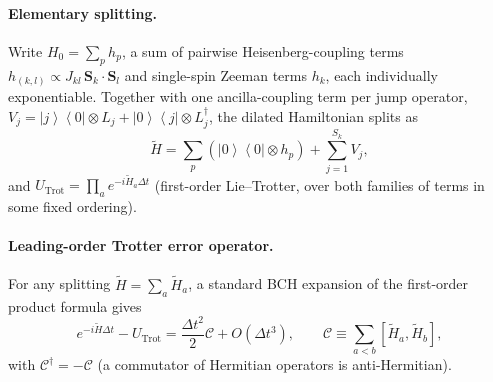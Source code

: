 \documentclass[11pt]{article}
\newcommand{\Dt}{\Delta t}
\newcommand{\calC}{\mathcal{C}}
\renewcommand{\ket}[1]{\left| #1 \right\rangle}
\renewcommand{\bra}[1]{\left\langle #1 \right|}
\begin{document}
\paragraph{Elementary splitting.} Write $H_0=\sum_ph_p$, a sum of pairwise Heisenberg-coupling terms $h_{(k,l)}\propto J_{kl}\,\mathbf{S}_k\cdot\mathbf{S}_l$ and single-spin Zeeman terms $h_k$, each individually exponentiable. Together with one ancilla-coupling term per jump operator, $V_j=\ket{j}\bra{0}\otimes L_j+\ket{0}\bra{j}\otimes L_j^\dagger$, the dilated Hamiltonian splits as
\begin{equation}
    \tilde{H} = \sum_p\left(\ket{0}\bra{0}\otimes h_p\right)+\sum_{j=1}^{S_k}V_j,
\end{equation}
and $U_{\text{Trot}}=\prod_a e^{-i\tilde{H}_a\Dt}$ (first-order Lie--Trotter, over both families of terms in some fixed ordering).

\paragraph{Leading-order Trotter error operator.} For any splitting $\tilde{H}=\sum_a\tilde{H}_a$, a standard BCH expansion of the first-order product formula gives
\begin{equation}\label{eq:trot_leading_op}
    e^{-i\tilde{H}\Dt}-U_{\text{Trot}} = \frac{\Dt^2}{2}\calC+O(\Dt^3),\qquad \calC\equiv\sum_{a<b}\left[\tilde{H}_a,\tilde{H}_b\right],
\end{equation}
with $\calC^\dagger=-\calC$ (a commutator of Hermitian operators is anti-Hermitian).
\end{document}

